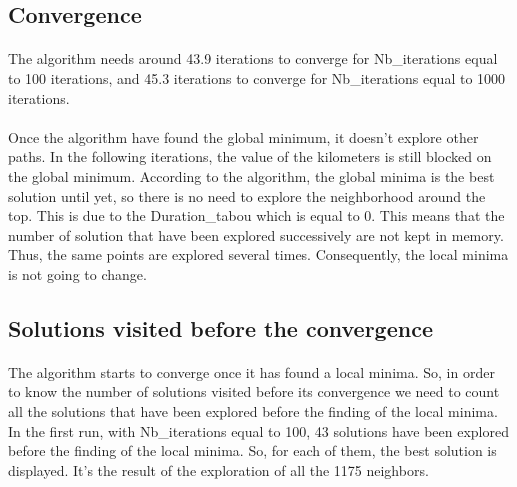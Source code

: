 \documentclass[12pt,oneside,a4paper]{article}
\begin{document}
\subsection{Convergence}
\paragraph{}
    The algorithm needs around 43.9 iterations to converge for Nb\_iterations equal to 100 iterations, and 45.3 iterations to converge for Nb\_iterations equal to 1000 iterations. 
\paragraph{}
    Once the algorithm have found the global minimum, it doesn't explore other paths. In the following iterations, the value of the kilometers is still blocked on the global minimum. 
    According to the algorithm, the global minima is the best solution until yet, so there is no need to explore the neighborhood around the top.  
    This is due to the Duration\_tabou which is equal to 0. This means that the number of solution that have been explored successively are not kept in memory. 
    Thus, the same points are explored several times. Consequently, the local minima is not going to change.

\newpage
\subsection{Solutions visited before the convergence}
\paragraph{}
    The algorithm starts to converge once it has found a local minima.
    So, in order to know the number of solutions visited before its convergence we need to count all the solutions 
    that have been explored before the finding of the local minima. 
    In the first run, with Nb\_iterations equal to 100, 43 solutions have been explored before the finding of the local minima. 
    So, for each of them, the best solution is displayed. It’s the result of the exploration of all the 1175 neighbors.
\end{document}
